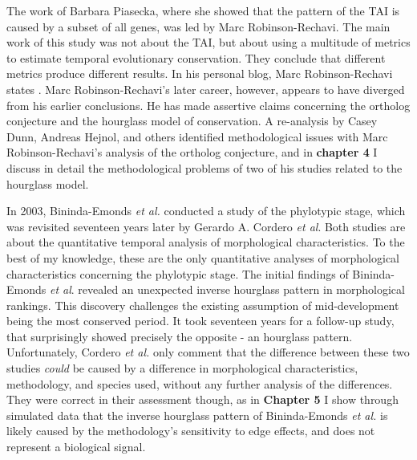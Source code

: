 The work of Barbara Piasecka, where she showed that the pattern of the TAI is caused by a subset of all genes, was led by Marc Robinson-Rechavi. The main work of this study was not about the TAI, but about using a multitude of metrics to estimate temporal evolutionary conservation. They conclude that different metrics produce different results. In his personal blog, Marc Robinson-Rechavi states \cite{robinsonrechaviblog}. Marc Robinson-Rechavi's later career, however, appears to have diverged from his earlier conclusions. He has made assertive claims concerning the ortholog conjecture\cite{KryuchkovaMostacci2016} and the hourglass model of conservation\cite{Liu2020,Liu2021,marletaz2018}. A re-analysis by Casey Dunn, Andreas Hejnol, and others identified methodological issues with Marc Robinson-Rechavi's analysis of the ortholog conjecture\cite{Dunn2018}, and in \textbf{chapter 4} I discuss in detail the methodological problems of two of his studies related to the hourglass model.

In 2003, Bininda-Emonds \textit{et al.} conducted a study of the phylotypic stage, which was revisited seventeen years later by Gerardo A. Cordero \textit{et al}\cite{OlafRP2003, Cordero2020}. Both studies are about the quantitative temporal analysis of morphological characteristics. To the best of my knowledge, these are the only quantitative analyses of morphological characteristics concerning the phylotypic stage. The initial findings of Bininda-Emonds \textit{et al}. revealed an unexpected inverse hourglass pattern in morphological rankings. This discovery challenges the existing assumption of mid-development being the most conserved period. It took seventeen years for a follow-up study, that surprisingly showed precisely the opposite - an hourglass pattern. Unfortunately, Cordero \textit{et al.} only comment that the difference between these two studies \textit{could} be caused by a difference in morphological characteristics, methodology, and species used, without any further analysis of the differences. They were correct in their assessment though, as in \textbf{Chapter 5} I show through simulated data that the inverse hourglass pattern of Bininda-Emonds \textit{et al.} is likely caused by the methodology's sensitivity to edge effects, and does not represent a biological signal.

